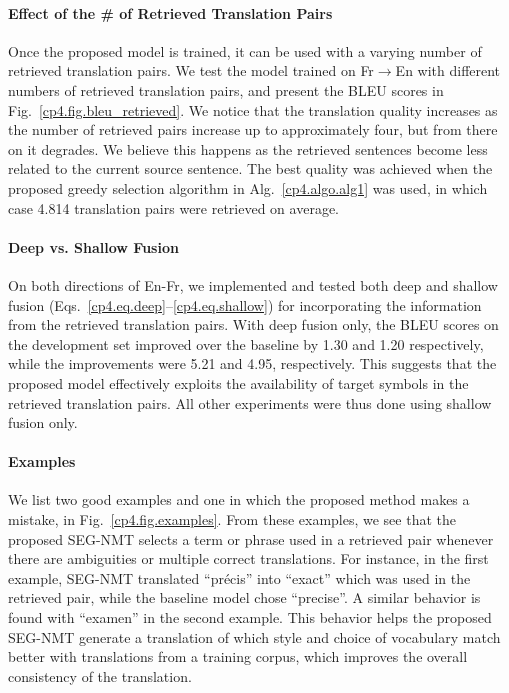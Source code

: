 \paragraph{Effect of the \# of Retrieved Translation Pairs}
Once the proposed model is trained, it can be used with a varying number of retrieved translation pairs. We test the model trained on Fr$\to$En with different numbers of retrieved translation pairs, and present the BLEU scores in Fig.~\ref{cp4.fig.bleu_retrieved}. We notice that the translation quality increases as the number of retrieved pairs increase up to approximately four, but from there on it degrades. We believe this happens as the retrieved sentences become less related to the current source sentence. The best quality was achieved when the proposed greedy selection algorithm in Alg.~\ref{cp4.algo.alg1} was used, in which case 4.814 translation pairs were retrieved on average. 

\paragraph{Deep vs. Shallow Fusion}
On both directions of En-Fr, we implemented and tested both deep and shallow fusion (Eqs.~\eqref{cp4.eq.deep}--\eqref{cp4.eq.shallow}) for incorporating the information from the retrieved translation pairs. With deep fusion only, the BLEU scores on the development set improved over the baseline by 1.30 and 1.20 respectively, while the improvements were 5.21 and 4.95, respectively. This suggests that the proposed model effectively exploits the availability of target symbols in the retrieved translation pairs. All other experiments were thus done using shallow fusion only.

\paragraph{Examples}
We list two good examples and one in which the proposed method makes a mistake, in Fig.~\ref{cp4.fig.examples}. From these examples, we see that the proposed SEG-NMT selects a term or phrase used in a retrieved pair whenever there are ambiguities or multiple correct translations. For instance, in the first example, SEG-NMT translated ``pr\'ecis'' into ``exact'' which was used in the retrieved pair, while the baseline model chose ``precise''. A similar behavior is found with ``examen'' in the second example. This behavior helps the proposed SEG-NMT generate a translation of which style and choice of vocabulary match better with translations from a training corpus, which improves the overall consistency of the translation.

